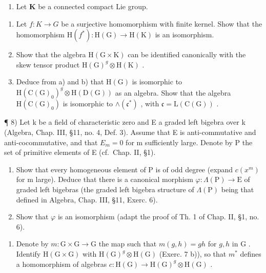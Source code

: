 \begin{enumerate}
\begin{enumerate}
\def\labelenumi{\arabic{enumi})}
\setcounter{enumi}{6}
\tightlist
\item
  Let \(\mathbf{K}\) be a connected compact Lie group.
\end{enumerate}

\begin{enumerate}
\def\labelenumi{\alph{enumi})}
\item
  Let \(f: K \to G\) be a surjective homomorphism with finite kernel. Show that the homomorphism \(\mathrm{H}(f^{*}) : \mathrm{H}(\mathrm{G}) \to \mathrm{H}(\mathrm{K})\) is an isomorphism.
\item
  Show that the algebra \(\mathrm{H}(\mathrm{G}\times\mathrm{K})\) can be identified canonically with the skew tensor product \(\mathrm{H}(\mathrm{G})^{g}\otimes\mathrm{H}(\mathrm{K})\) .
\item
  Deduce from a) and b) that \(\mathrm{H}(\mathrm{G})\) is isomorphic to \(\mathrm{H}(\mathrm{C}(\mathrm{G})_{0})^{g}\otimes\mathrm{H}(\mathrm{D}(\mathrm{G}))\) as an algebra. Show that the algebra \(\mathrm{H}(\mathrm{C}(\mathrm{G})_{0})\) is isomorphic to \(\wedge(\mathfrak{c}^{*})\) , with \(\mathfrak{c}=\mathrm{L}(\mathrm{C}(\mathrm{G}))\) .
\end{enumerate}

¶ 8) Let k be a field of characteristic zero and E a graded left bigebra over k (Algebra, Chap. III, §11, no. 4, Def. 3). Assume that E is anti-commutative and anti-cocommutative, and that \(E_{m} = 0\) for m sufficiently large. Denote by P the set of primitive elements of E (cf.~Chap. II, §1).

\begin{enumerate}
\def\labelenumi{\alph{enumi})}
\item
  Show that every homogeneous element of P is of odd degree (expand \(c(x^{m})\) for m large). Deduce that there is a canonical morphism \(\varphi : \Lambda(\mathrm{P}) \to \mathrm{E}\) of graded left bigebras (the graded left bigebra structure of \(\Lambda(\mathrm{P})\) being that defined in Algebra, Chap. III, §11, Exerc. 6).
\item
  Show that \(\varphi\) is an isomorphism (adapt the proof of Th. 1 of Chap. II, §1, no. 6).
\end{enumerate}

\begin{enumerate}
\def\labelenumi{\arabic{enumi})}
\setcounter{enumi}{8}
\tightlist
\item
  Denote by \(m: \mathrm{G} \times \mathrm{G} \to \mathrm{G}\) the map such that \(m(g, h) = gh\) for \(g, h\) in \(\mathrm{G}\) . Identify \(\mathrm{H}(\mathrm{G} \times \mathrm{G})\) with \(\mathrm{H}(\mathrm{G})^g \otimes \mathrm{H}(\mathrm{G})\) (Exerc. 7 b)), so that \(m^*\) defines a homomorphism of algebras \(c: \mathrm{H}(\mathrm{G}) \to \mathrm{H}(\mathrm{G})^g \otimes \mathrm{H}(\mathrm{G})\) .
\end{enumerate}


\end{enumerate}
